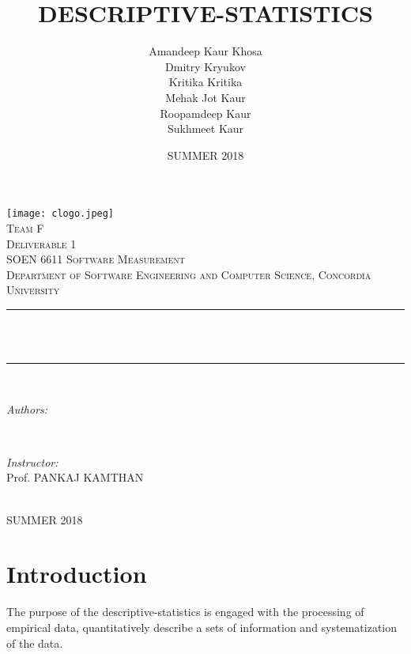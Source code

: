 \documentclass[12pt]{article}
\title{DESCRIPTIVE-STATISTICS}
\date{SUMMER 2018}
\author{
Amandeep Kaur Khosa\\
Dmitry Kryukov\\
Kritika Kritika\\
Mehak Jot Kaur\\
Roopamdeep Kaur\\
Sukhmeet Kaur
}
\begin{document}
            
\begin{titlepage}
\newcommand{\HRule}{\rule{\linewidth}{0.5mm}} 
\texttt{[image: clogo.jpeg]}\\[1cm]
\center
\textsc{\huge Team F}\\[1.0cm]
\textsc{\LARGE Deliverable 1}\\[0.5cm]
\textsc{\Large SOEN 6611 Software Measurement}\\[0.5cm]
\textsc{\large Department of Software Engineering and Computer Science, Concordia University}\\[0.5cm]
\makeatletter

\HRule \\[1.0cm]
{ \huge \bfseries \@title}\\[0.5cm]
\HRule \\[1.5cm]

\begin{minipage}{0.4\textwidth}
\begin{flushleft} \large
\emph{Authors:}\\
\@author %
\end{flushleft}
\end{minipage}
~
\begin{minipage}{0.4\textwidth}
\begin{flushright} \large
\emph{Instructor:} \\
Prof. PANKAJ KAMTHAN \\[1.2em] %
\end{flushright}
\end{minipage}\\[2cm]
\makeatother
{\large SUMMER 2018}\\[2cm] 
\vfill
\end{titlepage}
\newpage
\tableofcontents
\section{Introduction}
The purpose of the descriptive-statistics is engaged with the processing of empirical data, quantitatively describe a sets of information and systematization of the data. 
\end{document}
